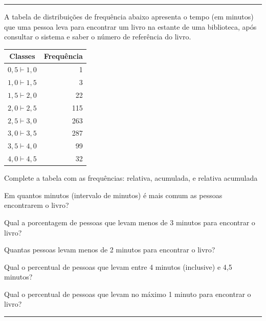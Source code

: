 \documentclass[a4paper,11pt,fleqn]{article}\usepackage[]{graphicx}\usepackage[]{color}
\theoremstyle{definition}
\begin{document}
\vspace{0.3cm}
\hrule
\vspace{0.3cm}

\begin{compactenum}[6.]
\item A tabela de distribuições de frequência abaixo apresenta o tempo
  (em minutos) que uma pessoa leva para encontrar um livro na estante
  de uma biblioteca, após consultar o sistema e saber o número de
  referência do livro.
  \begin{table}[h]
    \centering
    \begin{tabular}{cr}
      \hline
      \textbf{Classes} & \textbf{Frequência} \\
      \hline
      $0,5 \vdash 1,0$ & 1 \\
      $1,0 \vdash 1,5$ & 3 \\
      $1,5 \vdash 2,0$ & 22 \\
      $2,0 \vdash 2,5$ & 115 \\
      $2,5 \vdash 3,0$ & 263 \\
      $3,0 \vdash 3,5$ & 287 \\
      $3,5 \vdash 4,0$ & 99 \\
      $4,0 \vdash 4,5$ & 32 \\
      \hline
    \end{tabular}
  \end{table}
  \begin{compactenum}
  \item Complete a tabela com as frequências: relativa, acumulada, e
    relativa acumulada
  \item Em quantos minutos (intervalo de minutos) é mais comum as
    pessoas encontrarem o livro?
  \item Qual a porcentagem de pessoas que levam menos de 3 minutos para
    encontrar o livro?
  \item Quantas pessoas levam menos de 2 minutos para encontrar o livro?
  \item Qual o percentual de pessoas que levam entre 4 minutos
    (inclusive) e 4,5 minutos?
  \item Qual o percentual de pessoas que levam no máximo 1 minuto para
    encontrar o livro?
  \end{compactenum}
\end{compactenum}

\vspace{0.3cm}
\hrule
\vspace{0.3cm}
\end{document}
